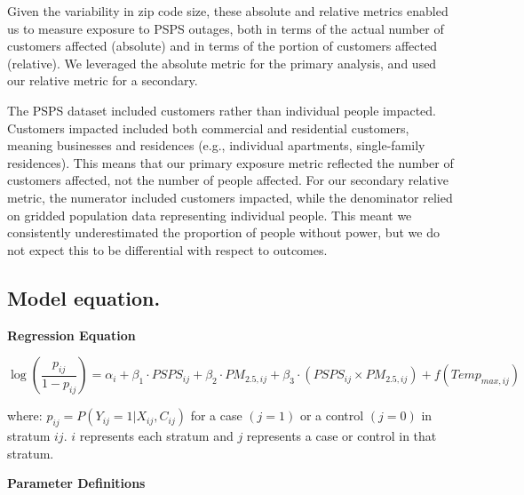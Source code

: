 \documentclass[../main.tex]{subfiles}
\begin{document}
Given the variability in zip code size, these absolute and relative metrics enabled us to measure exposure to PSPS outages, both in terms of the actual number of customers affected (absolute) and in terms of the portion of customers affected (relative). We leveraged the absolute metric for the primary analysis, and used our relative metric for a secondary.

The PSPS dataset included customers rather than individual people impacted. Customers impacted included both commercial and residential customers, meaning businesses and residences (e.g., individual apartments, single-family residences). This means that our primary exposure metric reflected the number of customers affected, not the number of people affected. For our secondary relative metric, the numerator included customers impacted, while the denominator relied on gridded population data representing individual people. This meant we consistently underestimated the proportion of people without power, but we do not expect this to be differential with respect to outcomes. 

\subsection{Model equation.}

\textbf{Regression Equation}

\begin{equation}
\log\left(\frac{p_{ij}}{1-p_{ij}}\right) = \alpha_i + \beta_1 \cdot PSPS_{ij} + \beta_2 \cdot PM_{2.5,ij} + \beta_3 \cdot (PSPS_{ij} \times PM_{2.5,ij}) + f(Temp_{max,ij})
\end{equation}

where: $p_{ij} = P(Y_{ij} = 1 | X_{ij}, C_{ij})$ for a case $(j = 1)$ or a control $(j = 0)$ in stratum $ij$. $i$ represents each stratum and $j$ represents a case or control in that stratum.

\vspace{1em}

\textbf{Parameter Definitions}
\end{document}

